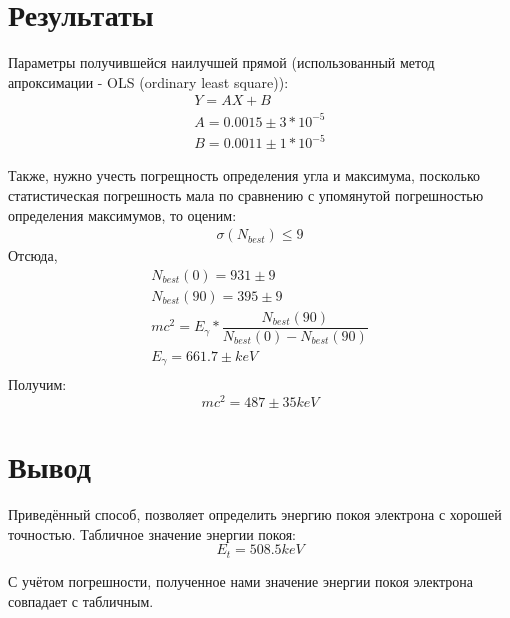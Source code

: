 \documentclass[12pt]{article}
\begin{document}
\section*{Результаты}
	
\noindent{}
Параметры получившейся наилучшей прямой (использованный метод апроксимации \-- OLS (ordinary least square)):
	\begin{eqnarray}
		Y = AX + B \\
		A = 0.0015 \pm 3*10^{-5} \\
		B = 0.0011 \pm 1*10^{-5}
	\end{eqnarray}
	
	Также, нужно учесть погрещность определения угла и максимума,
	посколько статистическая погрешность мала по сравнению с упомянутой погрешностью определения максимумов, то оценим:
	\begin{eqnarray}
		\sigma(N_{best}) \leq 9
	\end{eqnarray}
	Отсюда, 
	\begin{eqnarray}
		N_{best}(0) = 931 \pm 9 \\
		N_{best}(90) = 395 \pm 9 \\
		mc^2 = E_\gamma * \dfrac{N_{best}(90)}{N_{best}(0) - N_{best}(90)} \\
		E_\gamma = 661.7 \pm keV \\
	\end{eqnarray}
	Получим:
	\begin{equation}
		mc^2 = 487 \pm 35 keV
	\end{equation}
	
\section*{Вывод}
	Приведённый способ, позволяет определить энергию покоя электрона с хорошей точностью.
	Табличное значение энергии покоя:
	\begin{equation}
		E_t = 508.5 keV
	\end{equation}
	
	С учётом погрешности, полученное нами значение энергии покоя электрона совпадает с табличным.
	
\end{document}
